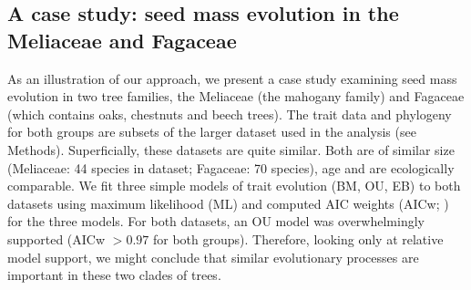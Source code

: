 \documentclass[a4paper,12pt]{article}
\begin{document}
\subsection{A case study: seed mass evolution in the Meliaceae and Fagaceae }
As an illustration of our approach, we present a case study examining seed mass evolution in two tree families, the Meliaceae (the mahogany family) and Fagaceae (which contains oaks, chestnuts and beech trees). The trait data and phylogeny for both groups are subsets of the larger dataset used in the analysis (see Methods). Superficially, these datasets are quite similar. Both are of similar size (Meliaceae: 44 species in dataset; Fagaceae: 70 species), age and are ecologically comparable. 
We fit three simple models of trait evolution (BM, OU, EB) to both datasets using maximum likelihood (ML) and computed AIC weights (AICw; \citep{Akaike1974, aicweight}) for the three models. For both datasets, an OU model was overwhelmingly supported (AICw $>0.97$ for both groups). Therefore, looking only at relative model support, we might conclude that similar evolutionary processes are important in these two clades of trees.
\end{document}
